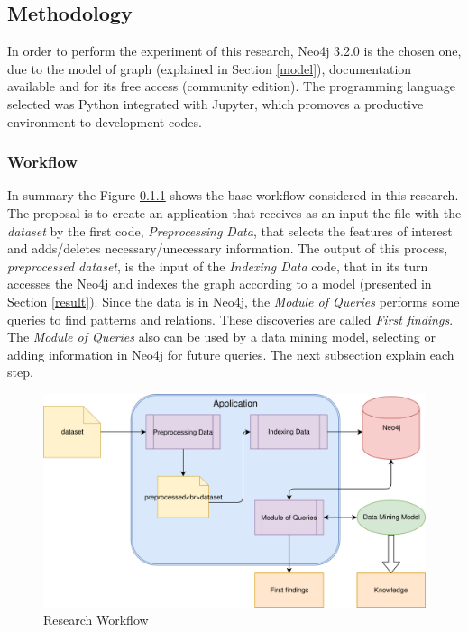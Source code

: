 \subsection{Methodology}\label{methodology}

In order to perform the experiment of this research, Neo4j 3.2.0
\cite{siteNeo4j} is the chosen one, due to the model of graph (explained
in Section \ref{model}), documentation available and for its free access
(community edition). The programming language selected was Python
integrated with Jupyter, which promoves a productive environment to
development codes.

\subsubsection{Workflow}\label{workflow}

In summary the Figure \ref{workflow} shows the base workflow considered
in this research. The proposal is to create an application that receives
as an input the file with the \emph{dataset} by the first code,
\emph{Preprocessing Data}, that selects the features of interest and
adds/deletes necessary/unecessary information. The output of this
process, \emph{preprocessed dataset}, is the input of the \emph{Indexing
Data} code, that in its turn accesses the Neo4j and indexes the graph
according to a model (presented in Section \ref{result}). Since the data
is in Neo4j, the \emph{Module of Queries} performs some queries to find
patterns and relations. These discoveries are called \emph{First
findings}. The \emph{Module of Queries} also can be used by a data
mining model, selecting or adding information in Neo4j for future
queries. The next subsection explain each step.

\begin{figure}
\centering
\includegraphics{../figures/Workflow-research.svg}
\caption{Research Workflow}
\end{figure}

